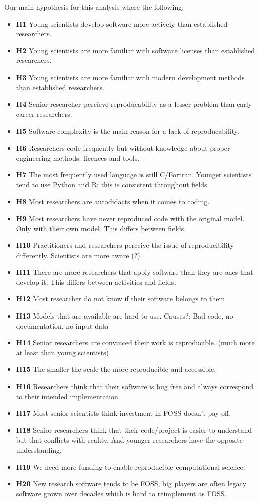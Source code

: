 \documentclass{article}
\begin{document}
Our main hypothesis for this analysis where the following:
\begin{itemize}
	\item \textbf{H1} Young scientists develop software more actively than established researchers.
	\item \textbf{H2} Young scientists are more familiar with software licenses than established researchers. 
	\item \textbf{H3} Young scientists are more familiar with modern development methods than established researchers. 
	\item \textbf{H4} Senior researcher percieve reproducability as a lesser problem than early career researchers.
 	\item \textbf{H5} Software complexity is the main reason for a lack of reproducability.
 	\item \textbf{H6} Researchers code frequently but without knowledge about proper engineering methods, licences and tools. 
 	\item \textbf{H7} The most frequently used language is still C/Fortran. Younger scientists tend to use Python and R; this is consistent throughout fields 
 	\item \textbf{H8} Most researchers are autodidacts when it comes to coding. 
 	\item \textbf{H9} Most researchers have never reproduced code with the original model. Only with their own model. This differs between fields. 
 	\item \textbf{H10} Practitioners and researchers perceive the issue of reproducibility differently. Scientists are more aware (?). 
	\item \textbf{H11} There are more researchers that apply software than they are ones that develop it. This differs between activities and fields. 
 	\item \textbf{H12} Most researcher do not know if their software belongs to them. 
 	\item \textbf{H13} Models that are available are hard to use. Causes?: Bad code, no documentation, no input data 
 	\item \textbf{H14} Senior researchers are convinced their work is reproducible. (much more at least than young scientists) 
 	\item \textbf{H15} The smaller the scale the more reproducible and accessible. 
 	\item \textbf{H16} Researchers think that their software is bug free and always correspond to their intended implementation. 
 	\item \textbf{H17} Most senior scientists think investment in FOSS doesn’t pay off. 
 	\item \textbf{H18} Senior researchers think that their code/project is easier to understand but that conflicts with reality. And younger researchers have the opposite understanding. 
 	\item \textbf{H19} We need more funding to enable reproducible computational science. 
 	\item \textbf{H20} New research software tends to be FOSS, big players are often legacy software grown over decades which is hard to reimplement as FOSS. 
\end{itemize}
\end{document}
